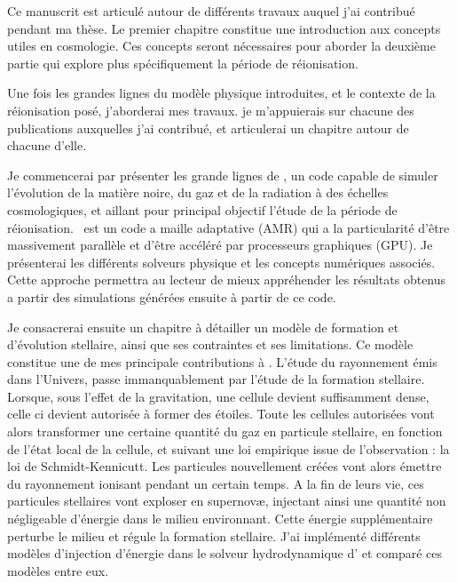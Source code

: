 Ce manuscrit est articulé autour de différents travaux auquel j'ai contribué pendant ma thèse.
Le premier chapitre constitue une introduction aux concepts utiles en cosmologie.
Ces concepts seront nécessaires pour aborder la deuxième partie qui explore plus spécifiquement la période de réionisation.

Une fois les grandes lignes du modèle physique introduites, et le contexte de la réionisation posé, j'aborderai mes travaux.
je m'appuierais sur chacune des publications auxquelles j'ai contribué, et articulerai un chapitre autour de chacune d'elle.  

Je commencerai par présenter les grande lignes de \emma, un code capable de simuler l'évolution de la matière noire, du gaz et de la radiation à des échelles cosmologiques, et aillant pour principal objectif l'étude de la période de réionisation.
\emma\ est un code a maille adaptative (AMR) qui a la particularité d'être massivement parallèle et d'être accéléré par processeurs graphiques (\ac{GPU}).
Je présenterai les différents solveurs physique et les concepts numériques associés.
Cette approche permettra au lecteur de mieux appréhender les résultats obtenus a partir des simulations générées ensuite à partir de ce code.

Je consacrerai ensuite un chapitre à détailler un modèle de formation et d'évolution stellaire, ainsi que ses contraintes et ses limitations.
Ce modèle constitue une de mes principale contributions à \emma{}.
L'étude du rayonnement émis dans l'Univers, passe immanquablement par l'étude de la formation stellaire.
Lorsque, sous l'effet de la gravitation, une cellule devient suffisamment dense, celle ci devient autorisée à former des étoiles.
Toute les cellules autorisées vont alors transformer une certaine quantité du gaz en particule stellaire, en fonction de l'état local de la cellule, et suivant une loi empirique issue de l'observation : la loi de Schmidt-Kennicutt.
Les particules nouvellement créées vont alors émettre du rayonnement ionisant pendant un certain temps.
A la fin de leurs vie, ces particules stellaires vont exploser en supernovæ, injectant ainsi une quantité non négligeable d'énergie dans le milieu environnant.
Cette énergie supplémentaire perturbe le milieu et régule la formation stellaire.
J'ai implémenté différents modèles d'injection d'énergie dans le solveur hydrodynamique d'\emma{ } et comparé ces modèles entre eux. 

